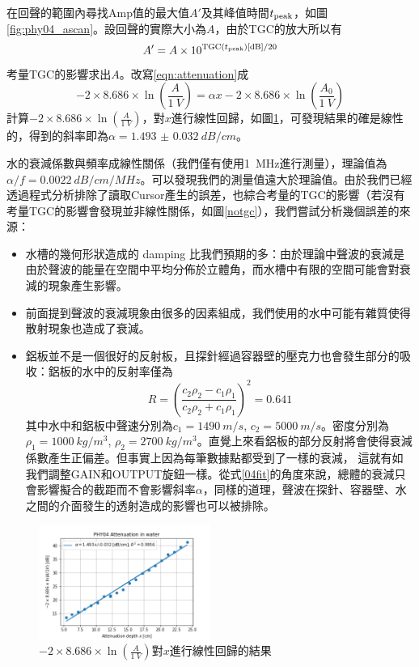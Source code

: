 \documentclass[12pt]{report}
\DeclareMathOperator{\TGC}{TGC}
\begin{document}
在回聲的範圍內尋找Amp值的最大值$A'$及其峰值時間$t_{\rm peak}$，如圖\ref{fig:phy04_ascan}。設回聲的實際大小為$A$，由於TGC的放大所以有
\begin{equation}
    A'=A\times 10^{\TGC(t_{\rm peak})[{\rm dB}]/20}
\end{equation}
考量TGC的影響求出$A$。改寫\ref{eqn:attenuation}成
\begin{equation}\label{04fit}
    -2\times 8.686 \times \ln\left(\frac{A}{\SI{1}{V}}\right)= \alpha x -2\times 8.686 \times \ln\left(\frac{A_0}{\SI{1}{V}}\right)
\end{equation}
計算$-2\times 8.686 \times \ln\left(\frac{A}{\SI{1}{V}}\right)$，對$x$進行線性回歸，如圖\ref{fig:phy04_result}，可發現結果的確是線性的，得到的斜率即為$\alpha=\SI{1.493(32)}{dB/cm}$。

水的衰減係數與頻率成線性關係（我們僅有使用\SI{1}{MHz}進行測量），理論值為$\alpha/f=\SI{0.0022}{dB/cm/MHz}$。可以發現我們的測量值遠大於理論值。由於我們已經透過程式分析排除了讀取Cursor產生的誤差，也綜合考量的TGC的影響（若沒有考量TGC的影響會發現並非線性關係，如圖\ref{notgc}），我們嘗試分析幾個誤差的來源：
\begin{itemize}
    \item 水槽的幾何形狀造成的 damping 比我們預期的多：由於理論中聲波的衰減是由於聲波的能量在空間中平均分佈於立體角，而水槽中有限的空間可能會對衰減的現象產生影響。
    \item 前面提到聲波的衰減現象由很多的因素組成，我們使用的水中可能有雜質使得散射現象也造成了衰減。
    \item 鋁板並不是一個很好的反射板，且探針經過容器壁的壓克力也會發生部分的吸收：鋁板的水中的反射率僅為
    \begin{equation}
        R=\left(\frac{c_2\rho_2-c_1\rho_1}{c_2\rho_2+c_1\rho_1}\right)^2=0.641
    \end{equation}
    其中水中和鋁板中聲速分別為$c_1=\SI{1490}{m/s}$, $c_2=\SI{5000}{m/s}$。密度分別為$\rho_1=\SI{1000}{kg/m^3}$, $\rho_2=\SI{2700}{kg/m^3}$。直覺上來看鋁板的部分反射將會使得衰減係數產生正偏差。但事實上因為每筆數據點都受到了一樣的衰減，
    這就有如我們調整GAIN和OUTPUT旋鈕一樣。從式\eqref{04fit}的角度來說，總體的衰減只會影響擬合的截距而不會影響斜率$\alpha$，同樣的道理，聲波在探針、容器壁、水之間的介面發生的透射造成的影響也可以被排除。
\end{itemize}

\begin{figure}[htbp]
    \centering
    \includegraphics[width=0.5\textwidth]{PHY04_result.png}
    \caption{$-2\times 8.686 \times \ln\left(\frac{A}{\SI{1}{V}}\right)$對$x$進行線性回歸的結果}
    \label{fig:phy04_result}
\end{figure}
\end{document}
